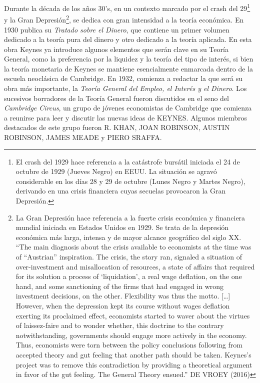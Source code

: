 \documentclass[10pt,a4paper]{article}
\begin{document}
Durante la década de los años 30's, en un contexto marcado por el crash del 29\footnote{%
    El crash del 1929 hace referencia a la catástrofe bursátil iniciada el 24 de octubre de 1929 (Jueves Negro) en EEUU. La situación se agravó considerable en los días 28 y 29 de octubre (Lunes Negro y Martes Negro), derivando en una crisis financiera cuyas secuelas provocaron la Gran Depresión.
} y la Gran Depresión\footnote{%
    La Gran Depresión hace referencia a la fuerte crisis económica y financiera mundial iniciada en Estados Unidos en 1929. Se trata de la depresión económica más larga, intensa y de mayor alcance geográfico del siglo XX.\\
“The main diagnosis about the crisis available to economists at the time was of “Austrian” inspiration. The crisis, the story ran, signaled a situation of over-investment and misallocation of resources, a state of affairs that required for its solution a process of ‘liquidation’, a real wage deflation, on the one hand, and some sanctioning of the firms that had engaged in wrong investment decisions, on the other. Flexibility was thus the motto. […] However, when the depression kept its course without wages deflation exerting its proclaimed effect, economists started to waver about the virtues of laissez-faire and to wonder whether, this doctrine to the contrary notwithstanding, governments should engage more actively in the economy. Thus, economists were torn between the policy conclusions following from accepted theory and gut feeling that another path should be taken. Keynes’s project was to remove this contradiction by providing a theoretical argument in favor of the gut feeling. The General Theory ensued.”
DE VROEY (2016)
}, se dedica con gran intensidad a la teoría económica. En 1930 publica su \textit{Tratado sobre el Dinero}, que contiene un primer volumen dedicado a la teoría pura del dinero y otro dedicado a la teoría aplicada. En esta obra Keynes ya introduce algunos elementos que serán clave en su Teoría General, como la preferencia por la liquidez y la teoría del tipo de interés, si bien la teoría monetaria de Keynes se mantiene esencialmente enmarcada dentro de la escuela neoclásica de Cambridge. En 1932, comienza a redactar la que será su obra más importante, la \textit{Teoría General del Empleo, el Interés y el Dinero}. Los sucesivos borradores de la Teoría General fueron discutidos en el seno del \textit{Cambridge Circus}, un grupo de jóvenes economistas de Cambridge que comienza a reunirse para leer y discutir las nuevas ideas de KEYNES. Algunos miembros destacados de este grupo fueron R. KHAN, JOAN ROBINSON, AUSTIN ROBINSON, JAMES MEADE y PIERO SRAFFA. 
\end{document}
